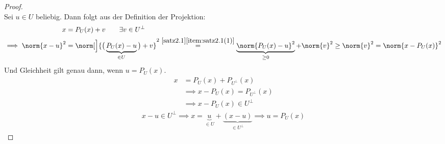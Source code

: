 \begin{proof}
	\\
	Sei $u\in U$ beliebig.
	Dann folgt aus der Definition der Projektion:
	\begin{align*}
		x&=P_U(x)+v\qquad\exists v\in U^\perp\\
		\implies\norm{x-u}^2&=\norm[\Big]{\big(\underbrace{P_U(x)-u}_{\in U}\big) +v}^2
		\overset{\ref{satz2.1}\ref{item:satz2.1(1)}}{=}
		\underbrace{\norm{P_U(x)-u}^2}_{\geq0}+\norm{v}^2
		\geq\norm{v}^2=\norm{x-P_U(x)}^2
	\end{align*}
	Und Gleichheit gilt genau dann, wenn $u=P_U(x)$.\nl
	\begin{align*}
		x&=P_U(x)+P_{U^\perp}(x)\\
		&\implies x-P_U(x)=P_{U^\perp}(x)\\
		&\implies x-P_U(x)\in U^\perp
	\end{align*}
	\begin{align*}
		x-u\in U^\perp
		\implies x=\underbrace{u}_{\in U}+\underbrace{(x-u)}_{\in U^\perp}
		\implies u=P_U(x)
	\end{align*}
\end{proof}

